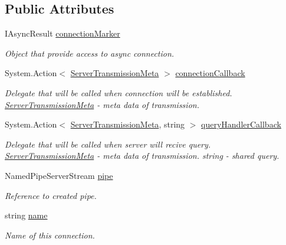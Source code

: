 \subsection*{Public Attributes}
\begin{DoxyCompactItemize}
\item 
I\+Async\+Result \mbox{\hyperlink{class_pipes_provider_1_1_server_transmission_meta_a1d4a87ad9a66bd81bc68f48fa28dbf32}{connection\+Marker}}
\begin{DoxyCompactList}\small\item\em Object that provide access to async connection. \end{DoxyCompactList}\item 
System.\+Action$<$ \mbox{\hyperlink{class_pipes_provider_1_1_server_transmission_meta}{Server\+Transmission\+Meta}} $>$ \mbox{\hyperlink{class_pipes_provider_1_1_server_transmission_meta_a6e9fa5426107e5d4265273e5be439a62}{connection\+Callback}}
\begin{DoxyCompactList}\small\item\em Delegate that will be called when connection will be established. \mbox{\hyperlink{class_pipes_provider_1_1_server_transmission_meta}{Server\+Transmission\+Meta}} -\/ meta data of transmission. \end{DoxyCompactList}\item 
System.\+Action$<$ \mbox{\hyperlink{class_pipes_provider_1_1_server_transmission_meta}{Server\+Transmission\+Meta}}, string $>$ \mbox{\hyperlink{class_pipes_provider_1_1_server_transmission_meta_aa663870a4d61945bcedd85721ede42a5}{query\+Handler\+Callback}}
\begin{DoxyCompactList}\small\item\em Delegate that will be called when server will recive query. \mbox{\hyperlink{class_pipes_provider_1_1_server_transmission_meta}{Server\+Transmission\+Meta}} -\/ meta data of transmission. string -\/ shared query. \end{DoxyCompactList}\item 
Named\+Pipe\+Server\+Stream \mbox{\hyperlink{class_pipes_provider_1_1_server_transmission_meta_a8b2ff8796056a5a2fbe0dbb4c4fd5dab}{pipe}}
\begin{DoxyCompactList}\small\item\em Reference to created pipe. \end{DoxyCompactList}\item 
string \mbox{\hyperlink{class_pipes_provider_1_1_server_transmission_meta_abed6acbaaf01392151667fad217ec7c3}{name}}
\begin{DoxyCompactList}\small\item\em Name of this connection. \end{DoxyCompactList}\end{DoxyCompactItemize}
